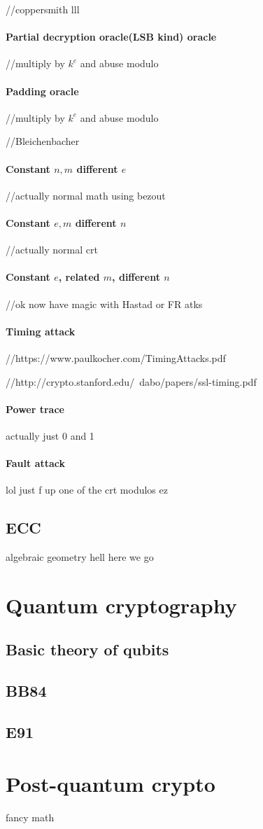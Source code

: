 \documentclass{report}
\begin{document}
//coppersmith lll
\subsection{Partial decryption oracle(LSB kind) oracle}
//multiply by $k^e$ and abuse modulo
\subsection{Padding oracle}
//multiply by $k^e$ and abuse modulo

//Bleichenbacher
\subsection{Constant $n,m$ different $e$}
//actually normal math using bezout
\subsection{Constant $e,m$ different $n$}
//actually normal crt
\subsection{Constant $e$, related $m$, different $n$}
//ok now have magic with Hastad or FR atks
\subsection{Timing attack}
//https://www.paulkocher.com/TimingAttacks.pdf

//http://crypto.stanford.edu/~dabo/papers/ssl-timing.pdf
\subsection{Power trace}
actually just 0 and 1
\subsection{Fault attack}
lol just f up one of the crt modulos ez
\chapter{ECC}
algebraic geometry hell here we go
\part{Quantum cryptography}
\chapter{Basic theory of qubits}
\chapter{BB84}
\chapter{E91}
\part{Post-quantum crypto}
fancy math
\end{document}
